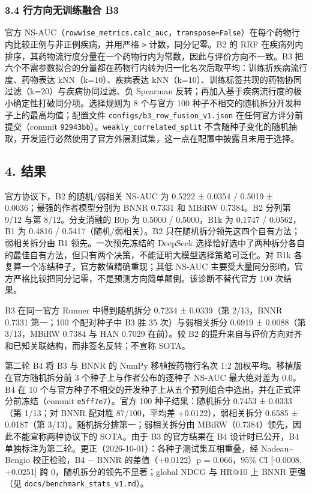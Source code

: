 \documentclass[
  10pt,
]{ctexart}
\begin{document}
\subsubsection{3.4 行方向无训练融合
B3}\label{34-ux884cux65b9ux5411ux65e0ux8badux7ec3ux878dux5408-b3}

官方
NS-AUC（\texttt{rowwise\_\allowbreak{}metrics.\allowbreak{}calc\_\allowbreak{}auc}，\texttt{transpose=False}）在每个药物行内比较正例与非正例疾病，并用严格
\texttt{\textgreater{}} 计数，同分记零。B2 的 RRF
在疾病列内排序，其药物流行度分量在一个药物行内为常数，因此与评价方向不一致。B3
把六个不需参数拟合的分量都在药物行内转为归一化名次后取平均：训练折疾病流行度、药物表达
kNN（k=10）、疾病表达
kNN（k=10）、训练标签共现的药物协同过滤（k=20）与疾病协同过滤、负
Spearman 反转；再加入基于疾病流行度的极小确定性打破同分项。选择规则为 8
个与官方 100 种子不相交的随机拆分开发种子上的最高均值；配置文件
\texttt{configs/\allowbreak{}b3\_\allowbreak{}row\_\allowbreak{}fusion\_\allowbreak{}v1.\allowbreak{}json} 在任何官方评分前提交（commit
\texttt{92943bb}）。\texttt{weakly\_\allowbreak{}correlated\_\allowbreak{}split}
不含随种子变化的随机抽取，开发运行必然使用了官方外层测试集，这一点在配置中披露且未用于选择。

\subsection{4. 结果}\label{4-ux7ed3ux679c}

官方协议下，B2 的随机/弱相关 NS-AUC 为 0.5222 ± 0.0354 / 0.5019 ±
0.0036；最强的作者模型分别为 BNNR 0.7331 和 MBiRW 0.7384。B2 分列第 9/12
与第 8/12。分支消融的 B0p 为 0.5000 / 0.5000，B1k 为 0.1747 / 0.0562，B1
为 0.4816 / 0.5417（随机/弱相关）。B2
只在随机拆分领先这四个自有方法；弱相关拆分由 B1 领先。一次预先冻结的
DeepSeek
选择恰好选中了两种拆分各自的最佳自有方法，但只有两个决策，不能证明大模型选择策略可泛化。对
B1k 各复算一个冻结种子，官方数值精确重现；其低 NS-AUC
主要受大量同分影响，官方严格比较把同分记零，不是预测方向简单颠倒。该诊断不替代官方
100 次结果。

B3 在同一官方 Runner 中得到随机拆分 0.7234 ± 0.0339（第 2/13，BNNR
0.7331 第一；100 个配对种子中 B3 胜 35 次）与弱相关拆分 0.6919 ±
0.0088（第 3/13，MBiRW 0.7384 与 HAN 0.7029 在前）。较 B2
的提升来自与评价方向对齐和已知关联结构，而非签名反转；不宣称 SOTA。

第二轮 B4 将 B3 与 BNNR 的 NumPy 移植按药物行名次 1:2
加权平均。移植版在官方随机拆分前 3 个种子上与作者公布的逐种子 NS-AUC
最大绝对差为 0.0。B4 在 10
个与官方种子不相交的开发种子上从五个预列组合中选出，并在正式评分前冻结（commit
\texttt{e5ff7e7}）。官方 100 种子结果：随机拆分 0.7453 ± 0.0333（第
1/13；对 BNNR 配对胜 87/100，平均差 +0.0122），弱相关拆分 0.6585 ±
0.0187（第 3/13）。随机拆分排第一；弱相关拆分由
MBiRW（0.7384）领先，因此不能宣称两种协议下的 SOTA。由于 B3 的官方结果在
B4 设计时已公开，B4
单独标注为第二轮。更正（2026-10-01）：各种子测试集互相重叠，经
Nadeau--Bengio 校正检验，B4 − BNNR 的差值（+0.0122）p = 0.066，95\% CI
{[}-0.0008, +0.0251{]} 跨 0，随机拆分的领先不显著；global NDCG 与 HR@10
上 BNNR 更强（见 \texttt{docs/\allowbreak{}benchmark\_\allowbreak{}stats\_\allowbreak{}v1.\allowbreak{}md}）。
\end{document}

